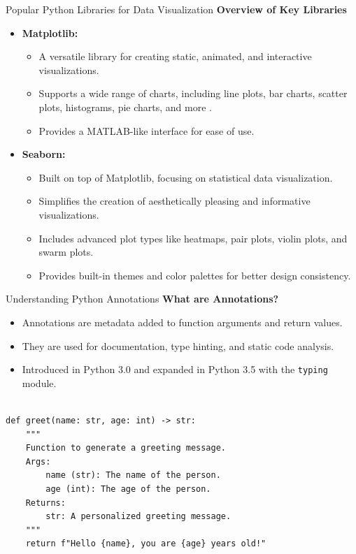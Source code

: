 \documentclass[10pt]{beamer}
\let\olditem\item
\renewcommand\item{\olditem\justifying}
\begin{document}
		
	\begin{frame}{Popular Python Libraries for Data Visualization}
		\textbf{Overview of Key Libraries}
		\begin{itemize}
			\item \textbf{Matplotlib:}
			\begin{itemize}
				\item A versatile library for creating static, animated, and interactive visualizations.
				\item Supports a wide range of charts, including line plots, bar charts, scatter plots, histograms, pie charts, and more \supercite{matplotlibExamplesx2014}.
				\item Provides a MATLAB-like interface for ease of use.
			\end{itemize}
			\item \textbf{Seaborn:}
			\begin{itemize}
				\item Built on top of Matplotlib, focusing on statistical data visualization.
				\item Simplifies the creation of aesthetically pleasing and informative visualizations.
				\item Includes advanced plot types like heatmaps, pair plots, violin plots, and swarm plots.
				\item Provides built-in themes and color palettes for better design consistency.
			\end{itemize}
		\end{itemize}
	\end{frame}
	
		
		
		
		
		
		
		
		
		
	
	\begin{frame}[fragile]{Understanding Python Annotations}
		\textbf{What are Annotations?}
		\begin{itemize}
			\item Annotations are metadata added to function arguments and return values.
			\item They are used for documentation, type hinting, and static code analysis.
			\item Introduced in Python 3.0 and expanded in Python 3.5 with the \texttt{typing} module.
		\end{itemize}
		
		\begin{lstlisting}[caption=Using Annotations in Python]

def greet(name: str, age: int) -> str:
	"""
	Function to generate a greeting message.
	Args:
		name (str): The name of the person.
		age (int): The age of the person.
	Returns:
		str: A personalized greeting message.
	"""
	return f"Hello {name}, you are {age} years old!"
		\end{lstlisting}
\end{frame}
	
\end{document}
